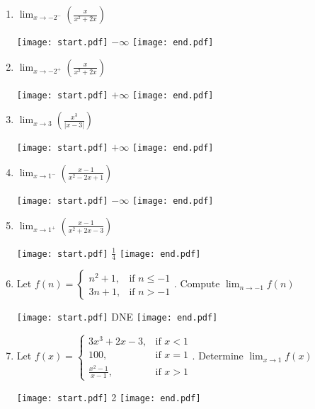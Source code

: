 \documentclass[12pt]{article}
\begin{document}
\begin{enumerate}
\item $\displaystyle \lim_{x\rightarrow -2^-}{\left(\frac{x}{x^2+2x}\right)}$

\texttt{[image: start.pdf]}
{{$-\infty$}}
\texttt{[image: end.pdf]}


\item $\displaystyle \lim_{x\rightarrow -2^+}{\left(\frac{x}{x^2+2x}\right)}$

\texttt{[image: start.pdf]}
{{$+\infty$}}
\texttt{[image: end.pdf]}

 
\item $\displaystyle \lim_{x\rightarrow 3}{\left(\frac{x^3}{|x-3|}\right)}$

\texttt{[image: start.pdf]}
{{$+\infty$}}
\texttt{[image: end.pdf]}


\item $\displaystyle \lim_{x \rightarrow 1^-}{\left(\frac{x-1}{x^2-2x+1}\right)}$

\texttt{[image: start.pdf]}
{{$-\infty$}}
\texttt{[image: end.pdf]}


\item $\displaystyle \lim_{x \rightarrow 1^+}{\left(\frac{x-1}{x^2+2x-3}\right)}$

\texttt{[image: start.pdf]}
{{$\displaystyle \frac{1}{4}$}}
\texttt{[image: end.pdf]}


\item Let $\displaystyle 
      f(n) = \begin{cases}
      n^2+1, & \text{if }n \leq -1 \\
      3n+1, & \text{if }n > -1 \end{cases}$. Compute $\displaystyle \lim_{n\rightarrow -1}{f(n)}$

\texttt{[image: start.pdf]}
{{DNE}}
\texttt{[image: end.pdf]}


\item Let $\displaystyle 
        f(x) = \begin{cases}
        3x^3+2x-3, & \text{if }x < 1   \\
        100, & \text{if }x = 1 \\
        \frac{x^2-1}{x-1}, & \text{if }x > 1 \end{cases}$. Determine $\displaystyle \lim_{x\rightarrow 1}{f(x)}$ 

\texttt{[image: start.pdf]}
{{2}}
\texttt{[image: end.pdf]}



\end{enumerate}
\end{document}
